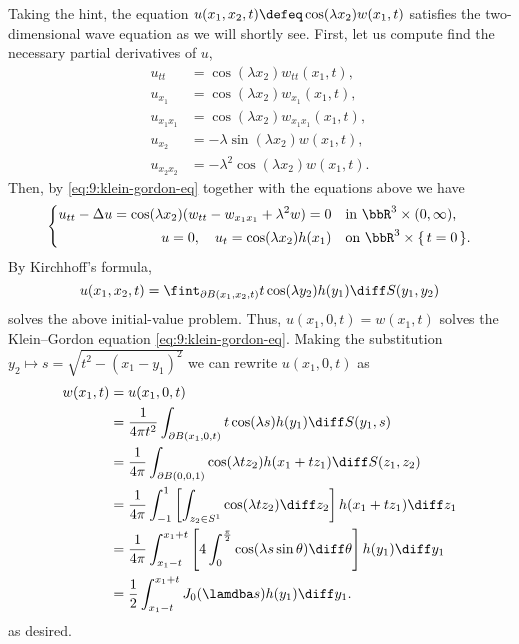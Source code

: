 \begin{solution}
  Taking the hint, the equation \(u(x_1,x_2,t)\defeq\cos(\lambda
  x_2)w(x_1,t)\) satisfies the two-dimensional wave equation as we will
  shortly see. First, let us compute find the necessary partial derivatives
  of \(u\),
  \begin{align*}
    u_{tt}&=\cos(\lambda x_2)w_{tt}(x_1,t),\\
    u_{x_1}&=\cos(\lambda x_2)w_{x_1}(x_1,t),\\
    u_{x_1x_1}&=\cos(\lambda x_2)w_{x_1x_1}(x_1,t),\\
    u_{x_2}&=-\lambda\sin(\lambda x_2)w(x_1,t),\\
    u_{x_2x_2}&=-\lambda^2\cos(\lambda x_2)w(x_1,t).
  \end{align*}
  Then, by \eqref{eq:9:klein-gordon-eq} together with the equations above
  we have
  \[
    \left\{
      \begin{aligned}
        u_{tt}-\Delta u=\cos(\lambda x_2)(w_{tt}-w_{x_1x_1}+\lambda^2 w)=0
        &&&\text{in \(\bbR^3\times(0,\infty)\),}\\
        u=0,\quad u_t=\cos(\lambda x_2)h(x_1)&&&\text{on
          \(\bbR^3\times\{\,t=0\,\}\).}
      \end{aligned}
    \right.
  \]
  By Kirchhoff's formula,
  \[
    u(x_1,x_2,t)=\fint_{\partial
      B(x_1,x_2,t)}t\cos(\lambda y_2)h(y_1)\diff S(y_1,y_2)
  \]
  solves the above initial-value problem. Thus, \(u(x_1,0,t)=w(x_1,t)\)
  solves the Klein--Gordon equation \eqref{eq:9:klein-gordon-eq}. Making
  the substitution \(y_2\mapsto s=\sqrt{t^2-(x_1-y_1)^2}\) we can rewrite
  \(u(x_1,0,t)\) as
  \begingroup
  \allowdisplaybreaks
  \begin{align*}
    w(x_1,t)
    &=u(x_1,0,t)\\
    &=\frac{1}{4\pi t^2}\int_{\partial B(x_1,0,t)} t\cos(\lambda
      s)h(y_1)\diff S(y_1,s)\\
    &=\frac{1}{4\pi}\int_{\partial B(0,0,1)}
      \cos(\lambda tz_2)h(x_1+tz_1)\diff
      S(z_1,z_2)\\
    &=\frac{1}{4\pi}\int_{-1}^1
      \left[
      \int_{z_2\in S^1}\cos(\lambda tz_2)\diff z_2
      \right]
      h(x_1+tz_1)\diff z_1\\
    &=\frac{1}{4\pi}\int_{x_1-t}^{x_1+t}
      \left[
      4\int_0^{\frac{\pi}{2}}\cos(\lambda s\sin\theta)\diff \theta
      \right]
      h(y_1)\diff y_1\\
    &=\frac{1}{2}\int_{x_1-t}^{x_1+t} J_0(\lamdba s) h(y_1)\diff y_1.
  \end{align*}
  \endgroup
  as desired.
\end{solution}
\newpage

